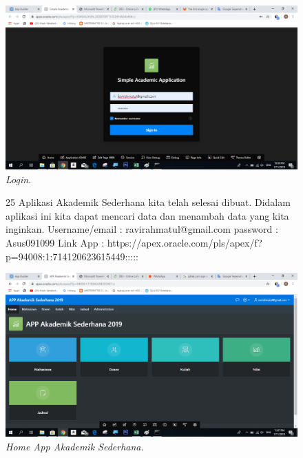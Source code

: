 \begin{enumerate}
\begin{figure}
    \begin{center}
    \includegraphics[scale=0.6]{figures/27.png}
    \caption{\textit{Login.}}
    \end{center}
    \label{gambar}
    \end{figure}   

\begin{figure}
\item[25]Aplikasi Akademik Sederhana kita telah selesai dibuat. Didalam aplikasi ini kita dapat mencari data dan menambah data yang kita inginkan.
Username/email : ravirahmatul@gmail.com
password : Asus091099
Link App : https://apex.oracle.com/pls/apex/f?p=94008:1:714120623615449:::::

    \begin{center}
    \includegraphics[scale=0.6]{figures/29.png}
    \caption{\textit{Home App Akademik Sederhana.}}
    \end{center}
    \label{gambar}
    \end{figure}   

\end{enumerate}
